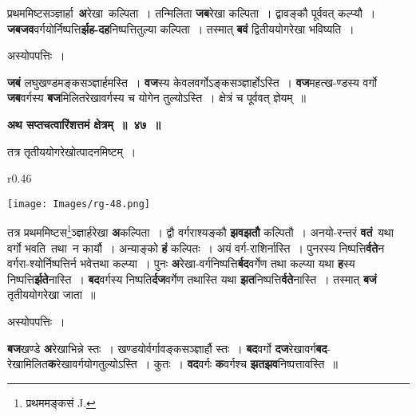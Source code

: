 \documentclass[11pt, openany]{book}
\begin{document}
 प्रथममिष्टसञ्ज्ञार्हा \,\textbf{अ}रेखा \,कल्पिता~। तन्मिलिता \;\textbf{जब}रेखा \;कल्पिता~। \;द्वावङ्कौ पूर्ववत् कल्प्यौ~। \textbf{जबजव}वर्गयोर्निष्पत्ति\textbf{र्झह-दह}निष्पत्तितुल्या कल्पिता~। तस्मात् \textbf{बवं} द्वितीययोगरेखा भविष्यति~। 

\newpage
\begin{center} 
अस्योपपत्तिः~।
\end{center}

 \textbf{जबं} लघुखण्डमङ्कसञ्ज्ञार्हमस्ति~। \textbf{वज}स्य केवलवर्गोऽङ्कसञ्ज्ञार्होऽस्ति~। \textbf{वज}महत्ख-ण्डस्य वर्गो \textbf{जब}वर्गस्य \textbf{बज}मिलितरेखावर्गस्य च योगेन तुल्योऽस्ति~। क्षेत्रं च पूर्ववत् ज्ञेयम्~॥ 
\vspace{2mm}
 
\begin{center}
\textbf{\large अथ सप्तचत्वारिंशत्तमं क्षेत्रम्~॥~४७~॥}
\end{center}

{\ab तत्र तृतीययोगरेखोत्पादनमिष्टम्~। }\\

\begin{wrapfigure}{r}{0.46\textwidth}
\vspace{-8mm}
\begin{flushright}
\texttt{[image: Images/rg-48.png]}
\end{flushright}
\vspace{-8mm}
\end{wrapfigure}

 तत्र प्रथममिष्टस\renewcommand{\thefootnote}{१}\footnote{प्रथममङ्कसं {\en J.}}ञ्ज्ञार्हरेखा \textbf{अ}कल्पिता~। द्वौ वर्गराश्यङ्कौ \textbf{झवझतौ} कल्पितौ~। अनयो-रन्तरं \;\textbf{वतं} \,यथा \;वर्गो \;भवति \,तथा \,न  कार्यौ~। अन्याङ्को \textbf{हं} कल्पितः~। अयं वर्ग-राशिर्नास्ति~। पुनरस्य निष्पत्ति\textbf{र्वते}न वर्गरा-श्योर्निष्पत्तिर्न भवेत्तथा कल्प्या~। पुनः \textbf{अ}रेखा-वर्गनिष्पत्ति\textbf{र्बद}वर्गेण तथा कल्प्या यथा \textbf{ह}स्य निष्पत्ति\textbf{र्झते}नास्ति~। \textbf{बद}वर्गस्य निष्पति\textbf{र्दज}वर्गेण तथास्ति यथा \textbf{झत}निष्पत्ति\textbf{र्वते}नास्ति~। तस्मात् \textbf{बजं} तृतीययोगरेखा जाता~॥ 
 
\begin{center}
अस्योपपत्तिः~।
\end{center}

 \textbf{बज}खण्डे \textbf{अ}रेखाभिन्ने स्तः~। खण्डयोर्वर्गावङ्कसञ्ज्ञार्हौ स्तः~। \textbf{बद}वर्गो \textbf{दज}रेखावर्ग\textbf{बद}-रेखामिलित\textbf{क}रेखावर्गयोगतुल्योऽस्ति~। कुतः~। \textbf{वद}वर्गः \textbf{क}वर्गश्च \textbf{झतझव}निष्पत्तावस्ति~॥
\vspace{-2mm}
\end{document}
